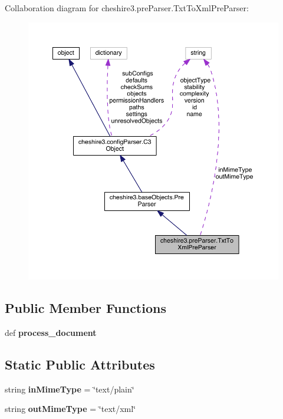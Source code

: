 Collaboration diagram for cheshire3.\-pre\-Parser.\-Txt\-To\-Xml\-Pre\-Parser\-:
\nopagebreak
\begin{figure}[H]
\begin{center}
\leavevmode
\includegraphics[width=350pt]{classcheshire3_1_1pre_parser_1_1_txt_to_xml_pre_parser__coll__graph}
\end{center}
\end{figure}
\subsection*{Public Member Functions}
\begin{DoxyCompactItemize}
\item 
\hypertarget{classcheshire3_1_1pre_parser_1_1_txt_to_xml_pre_parser_a678ec90848500f204dc6c5d94c7114d4}{def {\bfseries process\-\_\-document}}\label{classcheshire3_1_1pre_parser_1_1_txt_to_xml_pre_parser_a678ec90848500f204dc6c5d94c7114d4}

\end{DoxyCompactItemize}
\subsection*{Static Public Attributes}
\begin{DoxyCompactItemize}
\item 
\hypertarget{classcheshire3_1_1pre_parser_1_1_txt_to_xml_pre_parser_a55216a7391ae38788b87b6bbbf58daf7}{string {\bfseries in\-Mime\-Type} = \char`\"{}text/plain\char`\"{}}\label{classcheshire3_1_1pre_parser_1_1_txt_to_xml_pre_parser_a55216a7391ae38788b87b6bbbf58daf7}

\item 
\hypertarget{classcheshire3_1_1pre_parser_1_1_txt_to_xml_pre_parser_a78f65303748df76621d8725a7ce7373a}{string {\bfseries out\-Mime\-Type} = \char`\"{}text/xml\char`\"{}}\label{classcheshire3_1_1pre_parser_1_1_txt_to_xml_pre_parser_a78f65303748df76621d8725a7ce7373a}

\end{DoxyCompactItemize}

